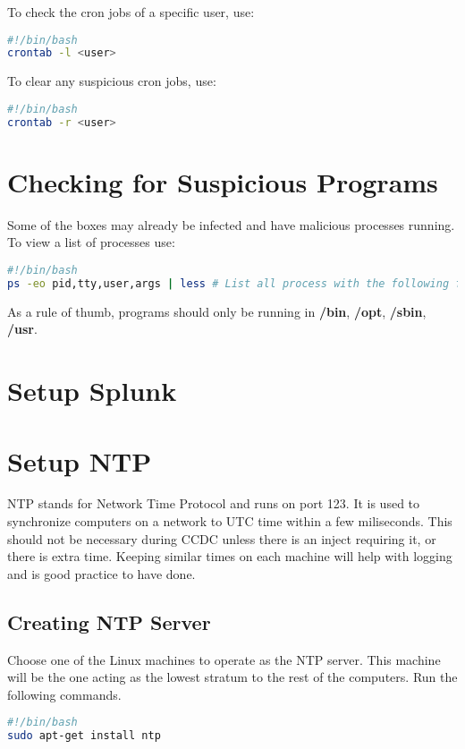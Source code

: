 \documentclass{article}
\begin{document}
To check the cron jobs of a specific user, use:

\begin{lstlisting}[language=bash]
#!/bin/bash
crontab -l <user>
\end{lstlisting}

To clear any suspicious cron jobs, use:
\begin{lstlisting}[language=bash]
#!/bin/bash
crontab -r <user>
\end{lstlisting}

\section{Checking for Suspicious Programs}
Some of the boxes may already be infected and have malicious processes running.
To view a list of processes use:

\begin{lstlisting}[language=bash]
#!/bin/bash
ps -eo pid,tty,user,args | less # List all process with the following format
\end{lstlisting}

As a rule of thumb, programs should only be running in \textbf{/bin},
\textbf{/opt}, \textbf{/sbin}, \textbf{/usr}.

\section{Setup Splunk}

\section{Setup NTP}
NTP stands for Network Time Protocol and runs on port 123. It is used to synchronize computers on a network to UTC time within a few miliseconds. This should not be necessary during CCDC unless there is an inject requiring it, or there is extra time. Keeping similar times on each 
machine will help with logging and is good practice to have done.

\subsection{Creating NTP Server}
Choose one of the Linux machines to operate as the NTP server. This machine will be the one
acting as the lowest stratum to the rest of the computers. Run the following commands.

\begin{lstlisting}[language=bash]
#!/bin/bash
sudo apt-get install ntp
\end{lstlisting}
\end{document}
